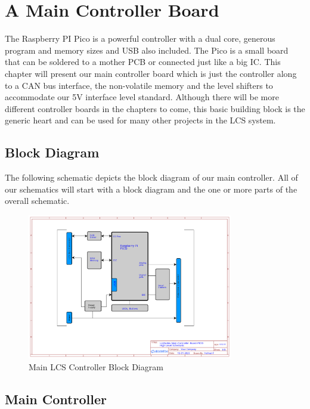 \chapter{A Main Controller Board}

The Raspberry PI Pico is a powerful controller with a dual core, generous program and memory sizes and USB also included. The Pico is a small board that can be soldered to a mother PCB or connected just like a big IC. This chapter will present our main controller board which is just the controller along to a CAN bus interface, the non-volatile memory and the level shifters to accommodate our 5V interface level standard. Although there will be more different controller boards in the chapters to come, this basic building block is the generic heart and can be used for many other projects in the LCS system.

\section{Block Diagram}

The following schematic depicts the block diagram of our main controller. All of our schematics will start with a block diagram and the one or more parts of the overall schematic.

\begin{figure}[htbp]
    \centering
    \includegraphics[page=1, width=0.8\textwidth]{./Schematics/Schematic_LcsNodes-Main-Controller-Board.pdf}
    \caption{Main LCS Controller Block Diagram}
\end{figure}
\FloatBarrier

\section{Main Controller}

